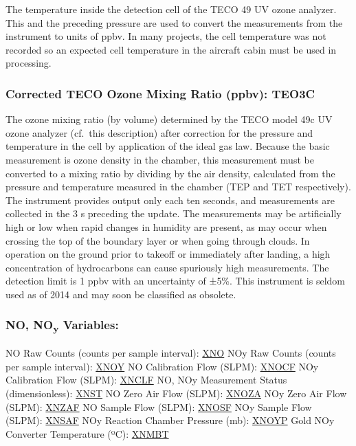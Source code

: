 \documentclass[
  english,
]{book}
\begin{document}
The temperature inside the detection cell of the TECO 49 UV ozone
analyzer. This and the preceding pressure are used to convert the
measurements from the instrument to units of ppbv. In many projects, the
cell temperature was not recorded so an expected cell temperature in the
aircraft cabin must be used in processing.

\hypertarget{te03c}{%
\subsubsection*{Corrected TECO Ozone Mixing Ratio (ppbv):
TEO3C}\label{te03c}}

The ozone mixing ratio (by volume) determined by the TECO model 49c UV
ozone analyzer (cf.~this description) after correction for the pressure
and temperature in the cell by application of the ideal gas law. Because
the basic measurement is ozone density in the chamber, this measurement
must be converted to a mixing ratio by dividing by the air density,
calculated from the pressure and temperature measured in the chamber
(TEP and TET respectively). The instrument provides output only each ten
seconds, and measurements are collected in the 3 s preceding the update.
The measurements may be artificially high or low when rapid changes in
humidity are present, as may occur when crossing the top of the boundary
layer or when going through clouds. In operation on the ground prior to
takeoff or immediately after landing, a high concentration of
hydrocarbons can cause spuriously high measurements. The detection limit
is 1 ppbv with an uncertainty of {±}5\%. This instrument is seldom used
as of 2014 and may soon be classified as obsolete.

\hypertarget{no-noy}{%
\subsubsection*{\texorpdfstring{NO, NO\textsubscript{y}
Variables:}{NO, NOy Variables:}}\label{no-noy}}

NO Raw Counts (counts per sample interval): \underline{XNO} NOy Raw
Counts (counts per sample interval): \underline{XNOY} NO Calibration
Flow (SLPM): \underline{XNOCF} NOy Calibration Flow (SLPM):
\underline{XNCLF} NO, NOy Measurement Status (dimensionless):
\underline{XNST} NO Zero Air Flow (SLPM): \underline{XNOZA} NOy Zero Air
Flow (SLPM): \underline{XNZAF} NO Sample Flow (SLPM): \underline{XNOSF}
NOy Sample Flow (SLPM): \underline{XNSAF} NOy Reaction Chamber Pressure
(mb): \underline{XNOYP} Gold NOy Converter Temperature ({º}C):
\underline{XNMBT}
\end{document}
